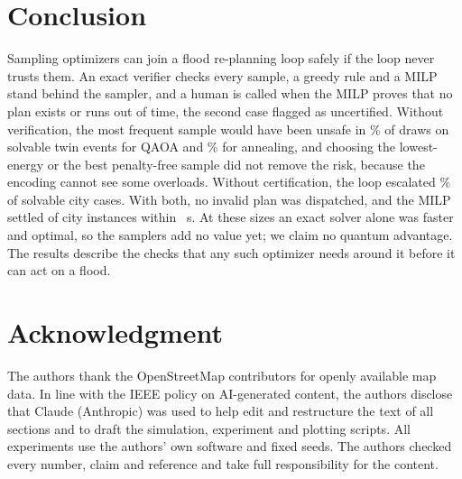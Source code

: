 \documentclass[conference]{IEEEtran}
\begin{document}
\section{Conclusion}
Sampling optimizers can join a flood re-planning loop safely if the loop never trusts them. An exact verifier checks every sample, a greedy rule and a MILP stand behind the sampler, and a human is called when the MILP proves that no plan exists or runs out of time, the second case flagged as uncertified. Without verification, the most frequent sample would have been unsafe in \TwinRawFeasQ\% of draws on solvable twin events for QAOA and \TwinRawFeasSA\% for annealing, and choosing the lowest-energy or the best penalty-free sample did not remove the risk, because the encoding cannot see some overloads. Without certification, the loop escalated \CityFalseEsc\% of solvable city cases. With both, no invalid plan was dispatched, and the MILP settled \CitySettled{} of \CityN{} city instances within \MilpMaxS~s. At these sizes an exact solver alone was faster and optimal, so the samplers add no value yet; we claim no quantum advantage. The results describe the checks that any such optimizer needs around it before it can act on a flood.

\section*{Acknowledgment}
The authors thank the OpenStreetMap contributors for openly available map data.
In line with the IEEE policy on AI-generated content, the authors disclose that Claude (Anthropic) was used to help edit and restructure the text of all sections and to draft the simulation, experiment and plotting scripts. All experiments use the authors' own software and fixed seeds. The authors checked every number, claim and reference and take full responsibility for the content.
\end{document}
